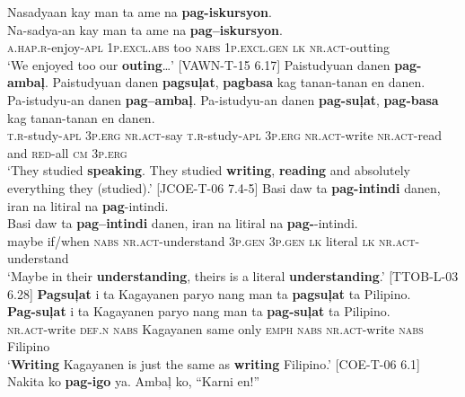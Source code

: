\ea
Nasadyaan  kay  man  ta  ame  na  \textbf{pag-iskursyon}. \\\smallskip
 \gll Na-sadya-an  kay  man  ta  ame  na  \textbf{pag--iskursyon}. \\
\textsc{a.hap.r}-enjoy-\textsc{apl}  1\textsc{p.excl.abs}  too  \textsc{nabs}  1\textsc{p.excl.gen}  \textsc{lk}  \textsc{nr.act}-outting \\
\glt ‘We enjoyed too our \textbf{outing}…’ [VAWN-T-15 6.17]
\z
\ea
Paistudyuan  danen  \textbf{pag-ambaļ}.  Paistudyuan  danen  \textbf{pagsuļat}, \textbf{pagbasa}  kag  tanan-tanan  en  danen. \\\smallskip
 \gll Pa-istudyu-an  danen  \textbf{pag--ambaļ}.  Pa-istudyu-an  danen  \textbf{pag-suļat}, \textbf{pag-basa}  kag\footnotemark{}  tanan-tanan  en  danen. \\
\textsc{t.r}-study-\textsc{apl}  3\textsc{p.erg}  \textsc{nr.act}-say  \textsc{t.r}-study-\textsc{apl}  3\textsc{p.erg}  \textsc{nr.act}-write \textsc{nr.act}-read  and  \textsc{red}-all  \textsc{cm}  3\textsc{p.erg} \\
\glt `They studied \textbf{speaking}. They studied \textbf{writing}, \textbf{reading} and absolutely everything they (studied).’ [JCOE-T-06 7.4-5]
\z  
\ea
Basi  daw  ta  \textbf{pag-intindi}  danen,  iran  na  litiral  na \textbf{pag}-intindi. \\\smallskip
 \gll Basi  daw  ta  \textbf{pag--intindi}  danen,  iran  na  litiral  na \textbf{pag-}-intindi. \\
maybe  if/when  \textsc{nabs}  \textsc{nr.act}-understand  3\textsc{p.gen}  3\textsc{p.gen}  \textsc{lk} literal  \textsc{lk} \textsc{nr.act}-understand \\
\glt `Maybe in their \textbf{understanding}, theirs is a literal \textbf{understanding}.’ [TTOB-L-03 6.28]
\z
\ea
\textbf{Pagsuļat}  i  ta  Kagayanen  paryo  nang  man  ta  \textbf{pagsuļat} ta  Pilipino. \\\smallskip
 \gll \textbf{Pag-suļat}  i  ta  Kagayanen  paryo  nang  man  ta  \textbf{pag-suļat} ta  Pilipino. \\
\textsc{nr.act}-write  \textsc{def.n}  \textsc{nabs}  Kagayanen  same  only  \textsc{emph}  \textsc{nabs}  \textsc{nr.act}-write \textsc{nabs}  Filipino \\
\glt `\textbf{Writing} Kagayanen is just the same as \textbf{writing} Filipino.’ [COE-T-06 6.1]
\z
\ea
Nakita  ko  \textbf{pag-igo}  ya.  Ambaļ  ko,  “Karni  en!” \\\smallskip
